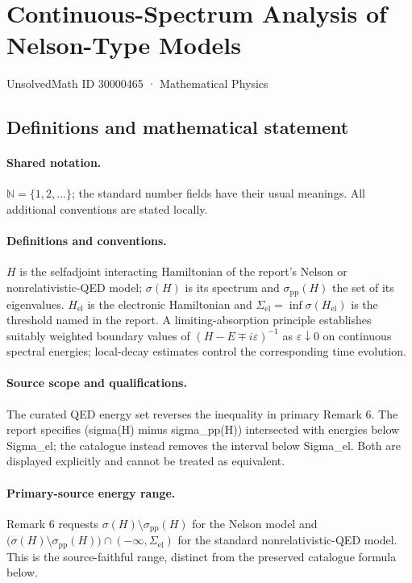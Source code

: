 \documentclass[11pt]{article}
\begin{document}
\setcounter{section}{30000464}
\section{Continuous-Spectrum Analysis of Nelson-Type Models}\label{30000465}
{\small UnsolvedMath ID 30000465 · Mathematical Physics}
\subsection{Definitions and mathematical statement}

\paragraph{Shared notation.}$\mathbb N=\{1,2,\ldots\}$; the standard number fields have their usual meanings. All additional conventions are stated locally.


\paragraph{Definitions and conventions.} $H$ is the selfadjoint interacting Hamiltonian of the report's Nelson or nonrelativistic-QED model; $\sigma(H)$ is its spectrum and $\sigma_{\mathrm{pp}}(H)$ the set of its eigenvalues. $H_{\mathrm{el}}$ is the electronic Hamiltonian and $\Sigma_{\mathrm{el}}=\inf\sigma(H_{\mathrm{el}})$ is the threshold named in the report. A limiting-absorption principle establishes suitably weighted boundary values of $(H-E\mp i\varepsilon)^{-1}$ as $\varepsilon\downarrow0$ on continuous spectral energies; local-decay estimates control the corresponding time evolution.

\paragraph{Source scope and qualifications.} The curated QED energy set reverses the inequality in primary Remark 6. The report specifies (sigma(H) minus sigma\_pp(H)) intersected with energies below Sigma\_el; the catalogue instead removes the interval below Sigma\_el. Both are displayed explicitly and cannot be treated as equivalent.

\paragraph{Primary-source energy range.} Remark 6 requests $\sigma(H)\setminus\sigma_{\mathrm{pp}}(H)$ for the Nelson model and $\bigl(\sigma(H)\setminus\sigma_{\mathrm{pp}}(H)\bigr)\cap(-\infty,\Sigma_{\mathrm{el}})$ for the standard nonrelativistic-QED model. This is the source-faithful range, distinct from the preserved catalogue formula below.
\end{document}
